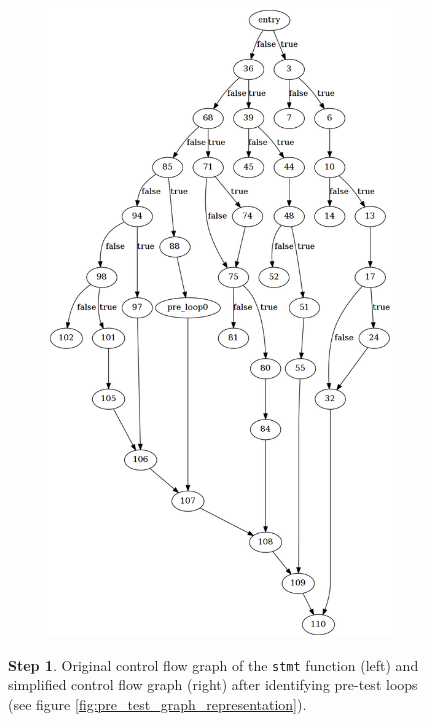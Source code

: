 \begin{figure}[htbp]
\begin{subfigure}[t]{0.45\textwidth}
		\includegraphics[width=\textwidth]{appendices/stmt_example/stmt_1.png}
	\end{subfigure}
	\caption{\textbf{Step 1}. Original control flow graph of the \texttt{stmt} function (left) and simplified control flow graph (right) after identifying pre-test loops (see figure \ref{fig:pre_test_graph_representation}).}
	\label{fig:step_1}
\end{figure}

